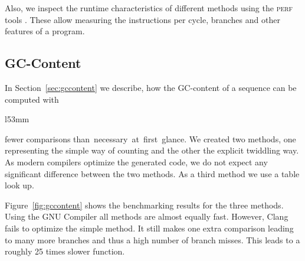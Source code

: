 \documentclass[10pt,letterpaper]{article}
\begin{document}
Also, we inspect the runtime characteristics of different methods using the \textsc{perf} tools \cite{perf}. These allow measuring the instructions per cycle, branches and other features of a program.


\subsection{GC-Content}
{
In Section~\ref{sec:gccontent} we describe, how the GC-content of a sequence can be computed with


\begin{wrapfigure}[12]{l}{53mm}
    \captionsetup{labelformat=empty} %
    \caption{}
    \label{fig:gccontent}
\end{wrapfigure}

\noindent fewer comparisons than~necessary~at~first~glance. We created two methods, one representing the simple way of counting and the other the explicit twiddling way. As modern compilers optimize the generated code, we do not expect any significant difference between the two methods. As a third method we use a table look up.

Figure~\ref{fig:gccontent} shows the benchmarking results for the three methods. 
Using the GNU Compiler all methods are almost equally fast. However, Clang fails to optimize the simple method. It still makes one extra comparison leading to many more branches and thus a high number of branch misses. This leads to a roughly 25 times slower function.

}
\end{document}
